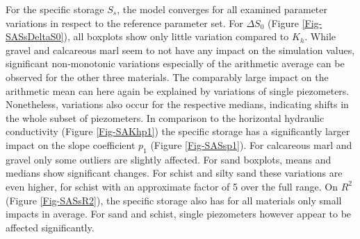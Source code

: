 For the specific storage $S_s$, the model converges for all examined parameter variations in respect to the reference parameter set. For $\Delta S_0$ (Figure \ref{Fig-SASsDeltaS0}), all boxplots show only little variation compared to $K_h$. While gravel and calcareous marl seem to not have any impact on the simulation values, significant non-monotonic variations especially of the arithmetic average can be observed for the other three materials. The comparably large impact on the arithmetic mean can here again be explained by variations of single piezometers. Nonetheless, variations also occur for the respective medians, indicating shifts in the whole subset of piezometers. In comparison to the horizontal hydraulic conductivity (Figure \ref{Fig-SAKhp1}) the specific storage has a significantly larger impact on the slope coefficient $p_1$ (Figure \ref{Fig-SASsp1}). For calcareous marl and gravel only some outliers are slightly affected. For sand boxplots, means and medians show significant changes. For schist and silty sand these variations are even higher, for schist with an approximate factor of 5 over the full range. On $R^2$ (Figure \ref{Fig-SASsR2}), the specific storage also has for all materials only small impacts in average. For sand and schist, single piezometers however appear to be affected significantly.


